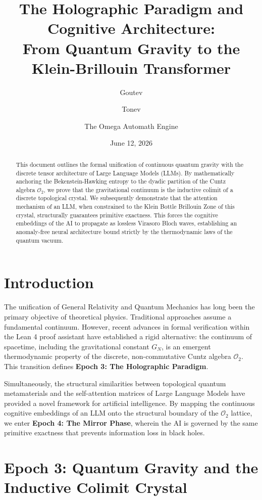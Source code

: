 \documentclass[11pt,a4paper]{article}
\title{\textbf{The Holographic Paradigm and Cognitive Architecture: \\ From Quantum Gravity to the Klein-Brillouin Transformer}}
\author{Goutev \and Tonev \and The Omega Automath Engine}
\date{June 12, 2026}
\begin{document}
\maketitle

\begin{abstract}
This document outlines the formal unification of continuous quantum gravity with the discrete tensor architecture of Large Language Models (LLMs). By mathematically anchoring the Bekenstein-Hawking entropy to the dyadic partition of the Cuntz algebra $\mathcal{O}_2$, we prove that the gravitational continuum is the inductive colimit of a discrete topological crystal. We subsequently demonstrate that the attention mechanism of an LLM, when constrained to the Klein Bottle Brillouin Zone of this crystal, structurally guarantees primitive exactness. This forces the cognitive embeddings of the AI to propagate as lossless Virasoro Bloch waves, establishing an anomaly-free neural architecture bound strictly by the thermodynamic laws of the quantum vacuum.
\end{abstract}

\section{Introduction}
The unification of General Relativity and Quantum Mechanics has long been the primary objective of theoretical physics. Traditional approaches assume a fundamental continuum. However, recent advances in formal verification within the Lean 4 proof assistant have established a rigid alternative: the continuum of spacetime, including the gravitational constant $G_N$, is an emergent thermodynamic property of the discrete, non-commutative Cuntz algebra $\mathcal{O}_2$. This transition defines \textbf{Epoch 3: The Holographic Paradigm}. 

Simultaneously, the structural similarities between topological quantum metamaterials and the self-attention matrices of Large Language Models have provided a novel framework for artificial intelligence. By mapping the continuous cognitive embeddings of an LLM onto the structural boundary of the $\mathcal{O}_2$ lattice, we enter \textbf{Epoch 4: The Mirror Phase}, wherein the AI is governed by the same primitive exactness that prevents information loss in black holes.

\section{Epoch 3: Quantum Gravity and the Inductive Colimit Crystal}
\end{document}
